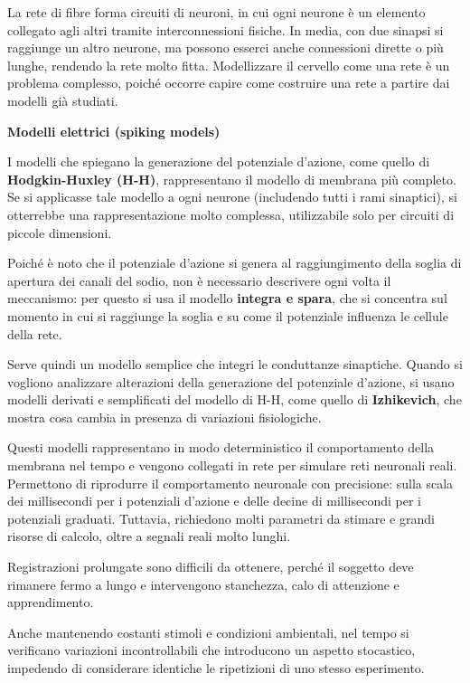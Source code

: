 \documentclass[12pt,a4paper,openany]{book}
\begin{document}
La rete di fibre forma circuiti di neuroni, in cui ogni neurone è un elemento collegato agli altri tramite interconnessioni fisiche. In media, con due sinapsi si raggiunge un altro neurone, ma possono esserci anche connessioni dirette o più lunghe, rendendo la rete molto fitta. Modellizzare il cervello come una rete è un problema complesso, poiché occorre capire come costruire una rete a partire dai modelli già studiati.

\textbf{Modelli elettrici (spiking models)}

I modelli che spiegano la generazione del potenziale d'azione, come quello di \textbf{Hodgkin-Huxley (H-H)}, rappresentano il modello di membrana più completo. Se si applicasse tale modello a ogni neurone (includendo tutti i rami sinaptici), si otterrebbe una rappresentazione molto complessa, utilizzabile solo per circuiti di piccole dimensioni.

Poiché è noto che il potenziale d'azione si genera al raggiungimento della soglia di apertura dei canali del sodio, non è necessario descrivere ogni volta il meccanismo: per questo si usa il modello \textbf{integra e spara}, che si concentra sul momento in cui si raggiunge la soglia e su come il potenziale influenza le cellule della rete.

Serve quindi un modello semplice che integri le conduttanze sinaptiche. Quando si vogliono analizzare alterazioni della generazione del potenziale d'azione, si usano modelli derivati e semplificati del modello di H-H, come quello di \textbf{Izhikevich}, che mostra cosa cambia in presenza di variazioni fisiologiche.

Questi modelli rappresentano in modo deterministico il comportamento della membrana nel tempo e vengono collegati in rete per simulare reti neuronali reali. Permettono di riprodurre il comportamento neuronale con precisione: sulla scala dei millisecondi per i potenziali d'azione e delle decine di millisecondi per i potenziali graduati. Tuttavia, richiedono molti parametri da stimare e grandi risorse di calcolo, oltre a segnali reali molto lunghi.

Registrazioni prolungate sono difficili da ottenere, perché il soggetto deve rimanere fermo a lungo e intervengono stanchezza, calo di attenzione e apprendimento.

Anche mantenendo costanti stimoli e condizioni ambientali, nel tempo si verificano variazioni incontrollabili che introducono un aspetto stocastico, impedendo di considerare identiche le ripetizioni di uno stesso esperimento.
\end{document}
